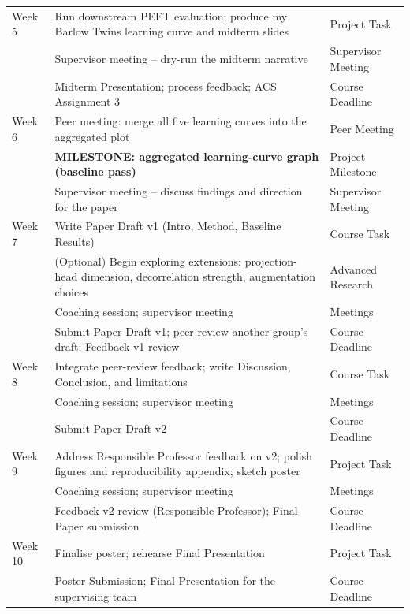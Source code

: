 \documentclass[english, a4paper]{article}
\begin{document}
{\begin{longtable}{p{1.2cm} p{9.5cm} p{3.5cm}}
Week 5 & Run downstream PEFT evaluation; produce my Barlow Twins learning curve and midterm slides & Project Task \\
       & Supervisor meeting -- dry-run the midterm narrative & Supervisor Meeting \\
       & Midterm Presentation; process feedback; ACS Assignment 3 & Course Deadline \\
\midrule

Week 6 & Peer meeting: merge all five learning curves into the aggregated plot & Peer Meeting \\
       & \textbf{MILESTONE: aggregated learning-curve graph (baseline pass)} & Project Milestone \\
       & Supervisor meeting -- discuss findings and direction for the paper & Supervisor Meeting \\
\midrule

Week 7 & Write Paper Draft v1 (Intro, Method, Baseline Results) & Course Task \\
       & (Optional) Begin exploring extensions: projection-head dimension, decorrelation strength, augmentation choices & Advanced Research \\
       & Coaching session; supervisor meeting & Meetings \\
       & Submit Paper Draft v1; peer-review another group's draft; Feedback v1 review & Course Deadline \\
\midrule

Week 8 & Integrate peer-review feedback; write Discussion, Conclusion, and limitations & Course Task \\
       & Coaching session; supervisor meeting & Meetings \\
       & Submit Paper Draft v2 & Course Deadline \\
\midrule

Week 9 & Address Responsible Professor feedback on v2; polish figures and reproducibility appendix; sketch poster & Project Task \\
       & Coaching session; supervisor meeting & Meetings \\
       & Feedback v2 review (Responsible Professor); Final Paper submission & Course Deadline \\
\midrule

Week 10 & Finalise poster; rehearse Final Presentation & Project Task \\
        & Poster Submission; Final Presentation for the supervising team & Course Deadline \\

\bottomrule
\end{longtable}
}

\printbibliography
\end{document}
